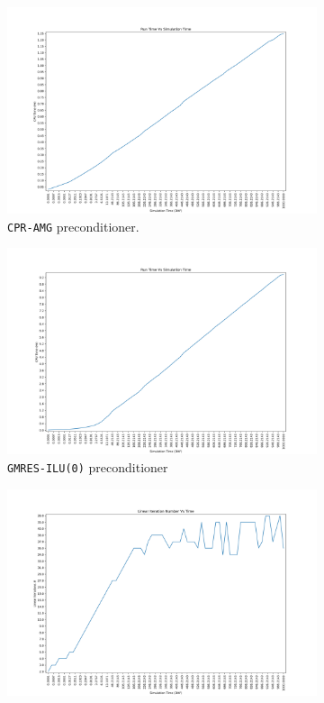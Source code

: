 \begin{figure}
\centering
\begin{subfigure}{.5\textwidth}
  \centering
  \includegraphics[width=1.1\linewidth]{figures/case1/cpr/cpu_time.png_reduced.png}
  \caption{\texttt{CPR-AMG} preconditioner.}
	\label{case1_cpu_cpr}
\end{subfigure}%
\begin{subfigure}{.5\textwidth}
  \centering
  \includegraphics[width=1.1\linewidth]{figures/case1/ilu/cpu_time.png_reduced.png}
  \caption{\texttt{GMRES-ILU(0)} preconditioner}
	\label{case1_cpu_ilu}
\end{subfigure}
\begin{subfigure}{.5\textwidth}
  \centering
  \includegraphics[width=1.1\linewidth]{figures/case1/cpr/its_time.png_reduced.png}

\end{subfigure}
\end{figure}
